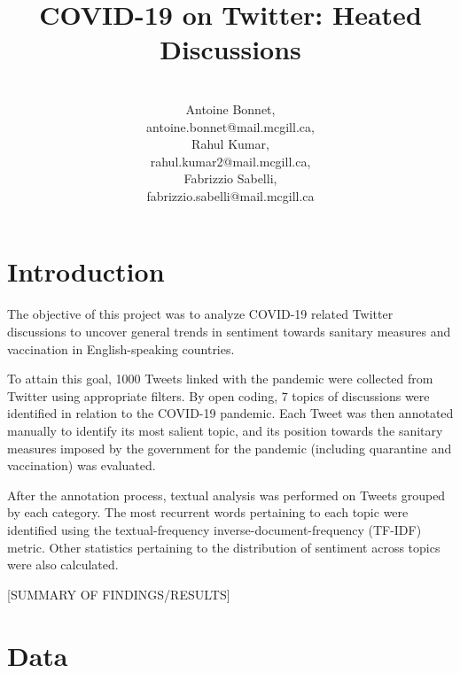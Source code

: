 \documentclass[letterpaper]{article} %
\title{COVID-19 on Twitter: Heated Discussions}
\author{  \\Antoine Bonnet, \\
antoine.bonnet@mail.mcgill.ca,
\\[3ex]
Rahul Kumar,\\
rahul.kumar2@mail.mcgill.ca, 
\\[3ex]
Fabrizzio Sabelli,\\
fabrizzio.sabelli@mail.mcgill.ca\vspace{0.5cm} }
\begin{document}


\maketitle

\section{Introduction}




The objective of this project was to analyze COVID-19 related Twitter discussions to uncover general trends in sentiment towards sanitary measures and vaccination in English-speaking countries. 


To attain this goal, 1000 Tweets linked with the pandemic were collected from Twitter using appropriate filters. By open coding, 7 topics of discussions were identified in relation to the COVID-19 pandemic. Each Tweet was then annotated manually to identify its most salient topic, and its position towards the sanitary measures imposed by the government for the pandemic (including quarantine and vaccination) was evaluated. 

After the annotation process, textual analysis was performed on Tweets grouped by each category. The most recurrent words pertaining to each topic were identified using the textual-frequency inverse-document-frequency (TF-IDF) metric. Other statistics pertaining to the distribution of sentiment across topics were also calculated. 


[SUMMARY OF FINDINGS/RESULTS]

\section{Data}

\end{document}
